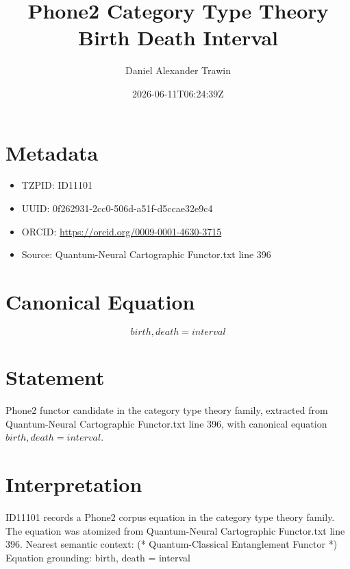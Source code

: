 \documentclass[11pt]{article}
\title{Phone2 Category Type Theory Birth Death Interval}
\author{Daniel Alexander Trawin}
\date{2026-06-11T06:24:39Z}
\begin{document}
\maketitle
\section*{Metadata}
\begin{itemize}
\item TZPID: ID11101
\item UUID: 0f262931-2cc0-506d-a51f-d5ccae32e9c4
\item ORCID: \url{https://orcid.org/0009-0001-4630-3715}
\item Source: Quantum-Neural Cartographic Functor.txt line 396
\end{itemize}
\section*{Canonical Equation}
\[
{birth, death} = interval
\]
\section*{Statement}
Phone2 functor candidate in the category type theory family, extracted from Quantum-Neural Cartographic Functor.txt line 396, with canonical equation ${birth, death} = interval$.
\section*{Interpretation}
ID11101 records a Phone2 corpus equation in the category type theory family. The equation was atomized from Quantum-Neural Cartographic Functor.txt line 396. Nearest semantic context: (* Quantum-Classical Entanglement Functor *) Equation grounding: {birth, death} = interval
\end{document}
